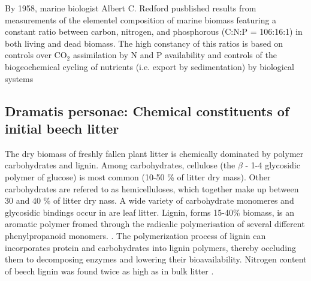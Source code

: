 By 1958, marine biologist Albert C. Redford pusblished results from measurements of the elementel composition of marine biomass featuring a constant ratio between carbon, nitrogen, and phosphorous (C:N:P = 106:16:1) in both living and dead biomass. The high constancy of this ratios is based on controls over CO$_2$ assimilation by N and P availability and controls of the  biogeochemical cycling of nutrients (i.e. export by sedimentation) by biological systems \citep{Cleveland2007}


\subsection{Dramatis personae: Chemical constituents of initial beech litter}

The dry biomass of freshly fallen plant litter is chemically dominated by polymer carbohydrates and lignin. Among carbohydrates, cellulose (the $\beta$ - 1-4 glycosidic polymer of glucose) is most common (10-50 \% of litter dry mass). Other carbohydrates are refered to as hemicelluloses, which together make up between 30 and 40 \% of litter dry nass. A wide variety of carbohydrate monomeres and glycosidic bindings occur in are leaf litter. Lignin, forms 15-40\% biomass, is an aromatic polymer fromed through the radicalic polymerisation of several different phenylpropanoid monomers. \citep[pp. 54f]{Berg2008}.  The polymerization process of lignin can incorporates protein and carbohydrates into lignin polymers, thereby occluding them to decomposing enzymes and lowering their bioavailability. Nitrogen content of beech lignin was found twice as high as in bulk litter \citep{Dykmans2002}. 




